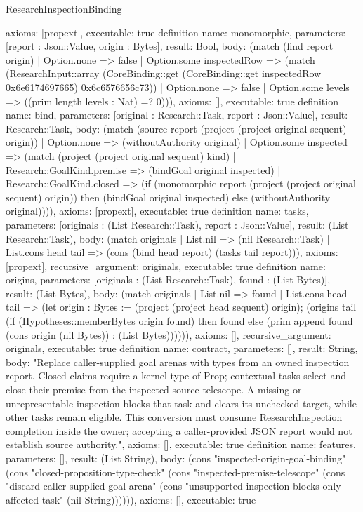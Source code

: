\begin{lexlean}{ResearchInspectionBinding}
\begin{semanticmodule}
{ axioms: [propext],
 executable: true
}
definition{
 name: monomorphic,
 parameters: [report : Json::Value, origin : Bytes],
 result: Bool,
 body: (match (find report origin) | Option.none => false | Option.some inspectedRow => (match (ResearchInput::array (CoreBinding::get (CoreBinding::get inspectedRow 0x6e6174697665) 0x6c6576656c73)) | Option.none => false | Option.some levels => ((prim length levels : Nat) =? 0))),
 axioms: [],
 executable: true
}
definition{
 name: bind,
 parameters: [original : Research::Task, report : Json::Value],
 result: Research::Task,
 body: (match (source report (project (project original sequent) origin)) | Option.none => (withoutAuthority original) | Option.some inspected => (match (project (project original sequent) kind) | Research::GoalKind.premise => (bindGoal original inspected) | Research::GoalKind.closed => (if (monomorphic report (project (project original sequent) origin)) then (bindGoal original inspected) else (withoutAuthority original)))),
 axioms: [propext],
 executable: true
}
definition{
 name: tasks,
 parameters: [originals : (List Research::Task), report : Json::Value],
 result: (List Research::Task),
 body: (match originals | List.nil => (nil Research::Task) | List.cons head tail => (cons (bind head report) (tasks tail report))),
 axioms: [propext],
 recursive_argument: originals,
 executable: true
}
definition{
 name: origins,
 parameters: [originals : (List Research::Task), found : (List Bytes)],
 result: (List Bytes),
 body: (match originals | List.nil => found | List.cons head tail => (let origin : Bytes := (project (project head sequent) origin); (origins tail (if (Hypotheses::memberBytes origin found) then found else (prim append found (cons origin (nil Bytes)) : (List Bytes)))))),
 axioms: [],
 recursive_argument: originals,
 executable: true
}
definition{
 name: contract,
 parameters: [],
 result: String,
 body: "Replace caller-supplied goal arenas with types from an owned inspection report. Closed claims require a kernel type of Prop; contextual tasks select and close their premise from the inspected source telescope. A missing or unrepresentable inspection blocks that task and clears its unchecked target, while other tasks remain eligible. This conversion must consume ResearchInspection completion inside the owner; accepting a caller-provided JSON report would not establish source authority.",
 axioms: [],
 executable: true
}
definition{
 name: features,
 parameters: [],
 result: (List String),
 body: (cons "inspected-origin-goal-binding" (cons "closed-proposition-type-check" (cons "inspected-premise-telescope" (cons "discard-caller-supplied-goal-arena" (cons "unsupported-inspection-blocks-only-affected-task" (nil String)))))),
 axioms: [],
 executable: true
}
\end{semanticmodule}
\end{lexlean}
